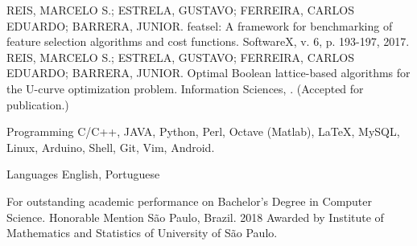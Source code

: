 \documentclass[11pt, a4paper]{awesome-cv-res}
\begin{document}
\begin{cventries}
\cventry
    {REIS, MARCELO S.; ESTRELA, GUSTAVO; FERREIRA, CARLOS EDUARDO; BARRERA, JUNIOR.}
    {featsel: A framework for benchmarking of feature selection algorithms and cost functions.}
    {SoftwareX, v. 6, p. 193-197, 2017.}
    {}
    {}
\cventry
    {REIS, MARCELO S.; ESTRELA, GUSTAVO; FERREIRA, CARLOS EDUARDO; BARRERA, JUNIOR.}
    {Optimal Boolean lattice-based algorithms for the U-curve optimization problem.}
    {Information Sciences, .}
    {}
    {(Accepted for publication.)}
\end{cventries}

\begin{cvskills}
\cvskill
{Programming} %
{C/C++, JAVA, Python, Perl, Octave (Matlab), LaTeX, MySQL, Linux, 
Arduino, Shell, Git, Vim, Android.} %

\cvskill
{Languages} %
{English, Portuguese} %
\end{cvskills}


\begin{cventries}
\cventry
    {For outstanding academic performance on Bachelor's Degree in Computer Science.}
    {Honorable Mention}
    {São Paulo, Brazil.}
    {2018}
    {Awarded by Institute of Mathematics and Statistics of University
    of São Paulo.}
\end{cventries}
\end{document}
